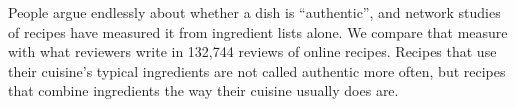 People argue endlessly about whether a dish is ``authentic'', and network studies of recipes have measured it from ingredient lists alone. We compare that measure with what reviewers write in 132,744 reviews of online recipes. Recipes that use their cuisine's typical ingredients are not called authentic more often, but recipes that combine ingredients the way their cuisine usually does are.
